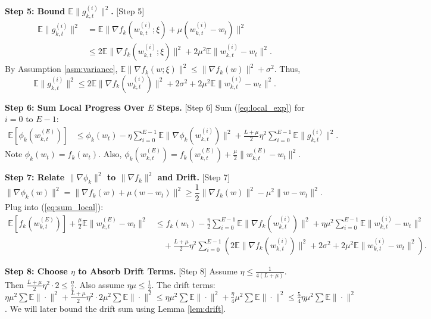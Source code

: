 \documentclass{article}
\begin{document}
\textbf{Step 5: Bound $\mathbb{E} \| g_{k,t}^{(i)} \|^2$.} [Step 5]
\begin{align}
    \mathbb{E} \| g_{k,t}^{(i)} \|^2 &= \mathbb{E} \| \nabla f_k(w_{k,t}^{(i)}; \xi) + \mu (w_{k,t}^{(i)} - w_t) \|^2 \\
    &\leq 2 \mathbb{E} \| \nabla f_k(w_{k,t}^{(i)}; \xi) \|^2 + 2 \mu^2 \mathbb{E} \| w_{k,t}^{(i)} - w_t \|^2. \label{eq:g_bound}
\end{align}
By Assumption \ref{asm:variance}, $\mathbb{E} \| \nabla f_k(w; \xi) \|^2 \leq \| \nabla f_k(w) \|^2 + \sigma^2$. Thus,
\begin{equation}
    \mathbb{E} \| g_{k,t}^{(i)} \|^2 \leq 2 \mathbb{E} \| \nabla f_k(w_{k,t}^{(i)}) \|^2 + 2\sigma^2 + 2\mu^2 \mathbb{E} \| w_{k,t}^{(i)} - w_t \|^2. \label{eq:g_bound2}
\end{equation}

\textbf{Step 6: Sum Local Progress Over $E$ Steps.} [Step 6]
Sum (\ref{eq:local_exp}) for $i=0$ to $E-1$:
\begin{align}
    \mathbb{E}[\phi_k(w_{k,t}^{(E)})] &\leq \phi_k(w_t) - \eta \sum_{i=0}^{E-1} \mathbb{E} \| \nabla \phi_k(w_{k,t}^{(i)}) \|^2 + \frac{L+\mu}{2} \eta^2 \sum_{i=0}^{E-1} \mathbb{E} \| g_{k,t}^{(i)} \|^2. \label{eq:sum_local}
\end{align}
Note $\phi_k(w_t) = f_k(w_t)$. Also, $\phi_k(w_{k,t}^{(E)}) = f_k(w_{k,t}^{(E)}) + \frac{\mu}{2} \| w_{k,t}^{(E)} - w_t \|^2$.

\textbf{Step 7: Relate $\| \nabla \phi_k \|^2$ to $\| \nabla f_k \|^2$ and Drift.} [Step 7]
\begin{equation}
    \| \nabla \phi_k(w) \|^2 = \| \nabla f_k(w) + \mu (w - w_t) \|^2 \geq \frac{1}{2} \| \nabla f_k(w) \|^2 - \mu^2 \| w - w_t \|^2. \label{eq:grad_phi}
\end{equation}
Plug into (\ref{eq:sum_local}):
\begin{align}
    \mathbb{E}[f_k(w_{k,t}^{(E)})] + \frac{\mu}{2} \mathbb{E} \| w_{k,t}^{(E)} - w_t \|^2 &\leq f_k(w_t) - \frac{\eta}{2} \sum_{i=0}^{E-1} \mathbb{E} \| \nabla f_k(w_{k,t}^{(i)}) \|^2 + \eta \mu^2 \sum_{i=0}^{E-1} \mathbb{E} \| w_{k,t}^{(i)} - w_t \|^2 \\
    &\quad + \frac{L+\mu}{2} \eta^2 \sum_{i=0}^{E-1} \left( 2 \mathbb{E} \| \nabla f_k(w_{k,t}^{(i)}) \|^2 + 2\sigma^2 + 2\mu^2 \mathbb{E} \| w_{k,t}^{(i)} - w_t \|^2 \right). \label{eq:local_bound}
\end{align}

\textbf{Step 8: Choose $\eta$ to Absorb Drift Terms.} [Step 8]
Assume $\eta \leq \frac{1}{4(L+\mu)}$. Then $\frac{L+\mu}{2} \eta^2 \cdot 2 \leq \frac{\eta}{4}$. Also assume $\eta \mu \leq \frac{1}{2}$.
The drift terms: $\eta \mu^2 \sum \mathbb{E} \| \cdot \|^2 + \frac{L+\mu}{2} \eta^2 \cdot 2\mu^2 \sum \mathbb{E} \| \cdot \|^2 \leq \eta \mu^2 \sum \mathbb{E} \| \cdot \|^2 + \frac{\eta}{4} \mu^2 \sum \mathbb{E} \| \cdot \|^2 \leq \frac{5}{4} \eta \mu^2 \sum \mathbb{E} \| \cdot \|^2$.
We will later bound the drift sum using Lemma \ref{lem:drift}.
\end{document}
